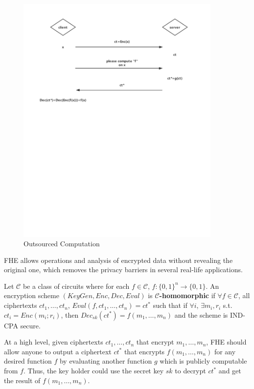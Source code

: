 \documentclass[usletter]{article}
\begin{document}
\begin{figure}[!htbp]
\begin{center}
\includegraphics[width=0.9\textwidth]{client-server.pdf}
\end{center}
\caption{Outsourced Computation}
\label{com}
\end{figure}

FHE allows operations and analysis of encrypted data without revealing the original one, which removes the privacy barriers in several real-life applications. 

\begin{definition} Let $\mathcal{C}$ be a class of circuits where for each $f\in\mathcal{C}$, $f:\{0,1\}^n \rightarrow \{0,1\}$. An encryption scheme $(KeyGen, Enc, Dec, Eval)$ is \textbf{$\mathcal{C}$-homomorphic} if $\forall f\in \mathcal{C}$, all ciphertexts $ct_1, \dots, ct_n$, $Eval(f, ct_1,\dots,ct_n)=ct^*$ such that if  $\forall i$, $\exists m_i, r_i$ s.t. $ct_i=Enc(m_i;r_i)$, then $Dec_{sk}(ct^*)=f(m_1,\dots,m_n)$ and the scheme is IND-CPA secure.
\end{definition}
At a high level, given ciphertexts $ct_1,\dots,ct_n$ that encrypt $m_1,\dots,m_n$, FHE should allow anyone to output a ciphertext  $ct^*$ that encrypts $f(m_1,\dots,m_n)$ for any desired function $f$ by evaluating another function $g$ which is publicly computable from $f$. Thus, the key holder could use the secret key $sk$ to decrypt $ct^*$ and get the result of $f(m_1,\dots,m_n)$. 
\end{document}
